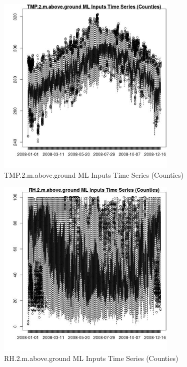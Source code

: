 \begin{figure} 
\centering  
\includegraphics[width=0.77\textwidth]{Code_Outputs/ML_input_report_ML_input_CountyGeometricCentroids_Locations_Dates_part_c_2008-01-01to2008-12-31_TMP.2.m.above.groundTS.jpg} 
\caption{\label{fig:ML_input_report_ML_input_CountyGeometricCentroids_Locations_Dates_part_c_2008-01-01to2008-12-31TMP.2.m.above.groundTS}TMP.2.m.above.ground ML Inputs Time Series (Counties)} 
\end{figure} 
 

\begin{figure} 
\centering  
\includegraphics[width=0.77\textwidth]{Code_Outputs/ML_input_report_ML_input_CountyGeometricCentroids_Locations_Dates_part_c_2008-01-01to2008-12-31_RH.2.m.above.groundTS.jpg} 
\caption{\label{fig:ML_input_report_ML_input_CountyGeometricCentroids_Locations_Dates_part_c_2008-01-01to2008-12-31RH.2.m.above.groundTS}RH.2.m.above.ground ML Inputs Time Series (Counties)} 
\end{figure} 
 

